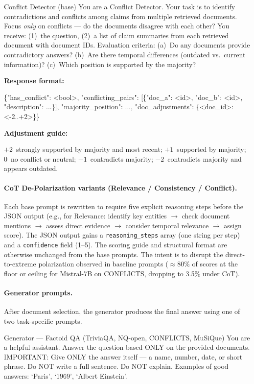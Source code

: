 \documentclass[11pt]{article}
\newcommand{\promptlabel}[1]{\par\vskip2pt\noindent\textbf{\footnotesize #1}\nobreak\par\nobreak\vskip1pt\nobreak}
\newcommand{\promptjson}[1]{{\par\ttfamily\footnotesize\raggedright #1\par}}
\theoremstyle{definition}
\begin{document}
\begin{promptbox}{Conflict Detector (base)}
You are a Conflict Detector. Your task is to identify contradictions and conflicts among claims from multiple retrieved documents. Focus \emph{only} on conflicts --- do the documents disagree with each other? You receive: (1)~the question, (2)~a list of claim summaries from each retrieved document with document IDs. Evaluation criteria: (a)~Do any documents provide contradictory answers? (b)~Are there temporal differences (outdated vs.\ current information)? (c)~Which position is supported by the majority?
\promptlabel{Response format:}
\promptjson{\{"has\_conflict": <bool>, "conflicting\_pairs": [\{"doc\_a": <id>, "doc\_b": <id>, "description": ...\}], "majority\_position": ..., "doc\_adjustments": \{<doc\_id>: <-2..+2>\}\}}
\promptlabel{Adjustment guide:}
$+2$~strongly supported by majority and most recent; $+1$~supported by majority; $0$~no conflict or neutral; $-1$~contradicts majority; $-2$~contradicts majority and appears outdated.
\end{promptbox}

\paragraph{CoT De-Polarization variants (Relevance / Consistency / Conflict).} Each base prompt is rewritten to require five explicit reasoning steps before the JSON output (e.g., for Relevance: identify key entities $\to$ check document mentions $\to$ assess direct evidence $\to$ consider temporal relevance $\to$ assign score). The JSON output gains a \texttt{reasoning\_steps} array (one string per step) and a \texttt{confidence} field (1--5). The scoring guide and structural format are otherwise unchanged from the base prompts. The intent is to disrupt the direct-to-extreme polarization observed in baseline prompts (\({\approx}80\%\) of scores at the floor or ceiling for Mistral-7B on CONFLICTS, dropping to 3.5\% under CoT).

\paragraph{Generator prompts.} After document selection, the generator produces the final answer using one of two task-specific prompts.

\begin{promptbox}{Generator --- Factoid QA (TriviaQA, NQ-open, CONFLICTS, MuSiQue)}
You are a helpful assistant. Answer the question based ONLY on the provided documents. IMPORTANT: Give ONLY the answer itself --- a name, number, date, or short phrase. Do NOT write a full sentence. Do NOT explain. Examples of good answers: `Paris', `1969', `Albert Einstein'.
\end{promptbox}
\end{document}
